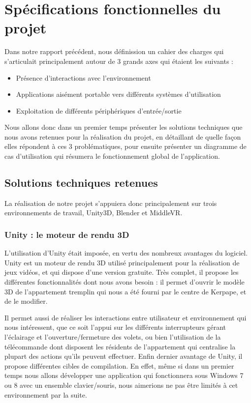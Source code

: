 \section{Spécifications fonctionnelles du projet}

Dans notre rapport précédent, nous définission un cahier des charges qui s'articulait principalement autour de 3 grands axes qui étaient les suivants : 
\begin{itemize}\renewcommand{\labelitemi}{$\bullet$}
\item Présence d'interactions avec l'environnement
\item Applications aisément portable vers différents systèmes d'utilisation
\item Exploitation de différents périphériques d'entrée/sortie
\end{itemize}
Nous allons donc dans un premier temps présenter les solutions techniques que nous avons retenues pour la réalisation du projet, en détaillant de quelle façon elles répondent à ces 3 problématiques, pour ensuite présenter un diagramme de cas d'utilisation qui résumera le fonctionnement global de l'application. 

\subsection{Solutions techniques retenues}
La réalisation de notre projet s'appuiera donc principalement sur trois environnements de travail, Unity3D, Blender et MiddleVR. 

\subsubsection{Unity : le moteur de rendu 3D}
L'utilisation d'Unity était imposée, en vertu des nombreux avantages du logiciel. Unity est un moteur de rendu 3D utilisé principalement pour la réalisation de jeux vidéos, et qui dispose d'une version gratuite. Très complet, il propose les différentes fonctionnalités dont nous avons besoin : il permet d'ouvrir le modèle 3D de l'appartement tremplin qui nous a été fourni par le centre de Kerpape, et de le modifier. \newline

Il permet aussi de réaliser les interactions entre utilisateur et environnement qui nous intéressent, que ce soit l'appui sur les différents interrupteurs gérant l'éclairage et l'ouverture/fermeture des volets, ou bien l'utilisation de la télécommande dont disposent les résidents de l'appartement qui centralise la plupart des actions qu'ils peuvent effectuer. 
Enfin dernier avantage de Unity, il propose différentes cibles de compilation. En effet, même si dans un premier temps nous allons développer une application qui fonctionnera sous Windows 7 ou 8 avec un ensemble clavier/souris, nous aimerions ne pas être limités à cet environnement par la suite. \newline


